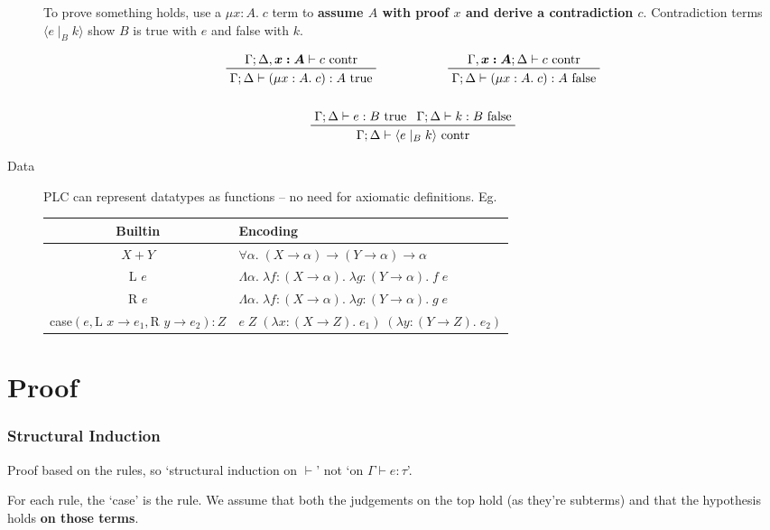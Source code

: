 \documentclass[a4paper,11pt]{article}
\begin{document}
\begin{description}
{    To prove something holds, use a \(\mu x:A.\;c\) term to \textbf{assume \(A\) with proof \(x\) and derive a contradiction \(c\)}. Contradiction terms \(\langle e \mid_B k \rangle\) show \(B\) is true with \(e\) and false with \(k\).

    \begin{gather*}
    \prftree[r]{}
    {\Gamma;\Delta,\bm{x:A} \vdash c\text{ contr}}
    {\Gamma;\Delta \vdash (\mu x:A.\;c) : A\text{ true}}
    \hspace{2cm}
    \prftree[r]{}
    {\Gamma,\bm{x:A};\Delta \vdash c\text{ contr}}
    {\Gamma;\Delta \vdash (\mu x:A.\;c) : A\text{ false}}
    \\
    \\
    \prftree[r]{}
    {\Gamma;\Delta \vdash e : B\text{ true}}
    {\Gamma;\Delta \vdash k : B\text{ false}}
    {\Gamma;\Delta \vdash \langle e \mid_B k \rangle \text{ contr}}
    \end{gather*}
}
\item[Data]
{\hfill

    PLC can represent datatypes as functions -- no need for axiomatic definitions. Eg.

    \begin{tabular}{c | l}
    Builtin & Encoding \\
    \hline
    \(X+Y\) & \(\forall\alpha.\;(X\rightarrow\alpha)\rightarrow(Y\rightarrow\alpha)\rightarrow\alpha\) \\
    L \(e\) & \(\Lambda\alpha.\;\lambda f:(X\rightarrow\alpha).\;\lambda g:(Y\rightarrow\alpha).\;f\;e\) \\
    R \(e\) & \(\Lambda\alpha.\;\lambda f:(X\rightarrow\alpha).\;\lambda g:(Y\rightarrow\alpha).\;g\;e\) \\
    case\((e,\text{L }x\rightarrow e_1,\text{R }y\rightarrow e_2) : Z\) & \(e\;Z\;(\lambda x:(X \rightarrow
    Z).\;e_1)\;(\lambda y:(Y \rightarrow Z).\;e_2)\)
    \end{tabular}
}
\end{description}

\section{Proof}
{
    \subsubsection*{Structural Induction}
    {
        Proof based on the rules, so `structural induction on \(\vdash\)' not `on \(\Gamma\vdash e : \tau\)'.

        For each rule, the `case' is the rule. We assume that both the judgements on the top hold (as they're subterms)
        and that the hypothesis holds \textbf{on those terms}.
    }
}
\end{document}
